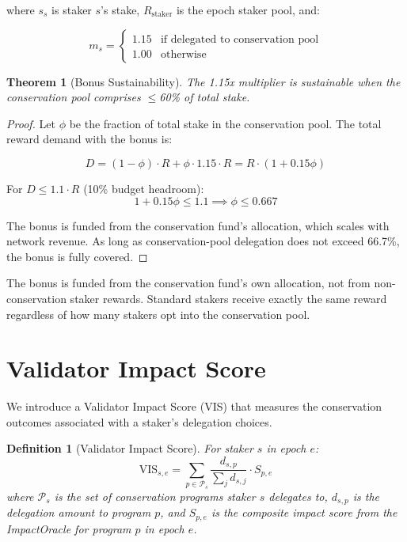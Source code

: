 \documentclass[11pt,letterpaper]{article}
\newtheorem{theorem}{Theorem}[section]
\newtheorem{definition}{Definition}[section]
\begin{document}
where $s_s$ is staker $s$'s stake, $R_{\text{staker}}$ is the epoch staker pool, and:

\begin{equation}
    m_s = \begin{cases} 1.15 & \text{if delegated to conservation pool} \\ 1.00 & \text{otherwise} \end{cases}
\end{equation}

\begin{theorem}[Bonus Sustainability]
The 1.15x multiplier is sustainable when the conservation pool comprises $\leq$60\% of total stake.
\end{theorem}

\begin{proof}
Let $\phi$ be the fraction of total stake in the conservation pool. The total reward demand with the bonus is:

\begin{equation}
    D = (1 - \phi) \cdot R + \phi \cdot 1.15 \cdot R = R \cdot (1 + 0.15\phi)
\end{equation}

For $D \leq 1.1 \cdot R$ (10\% budget headroom):
\begin{equation}
    1 + 0.15\phi \leq 1.1 \implies \phi \leq 0.667
\end{equation}

The bonus is funded from the conservation fund's allocation, which scales with network revenue. As long as conservation-pool delegation does not exceed 66.7\%, the bonus is fully covered.
\end{proof}

The bonus is funded from the conservation fund's own allocation, not from non-conservation staker rewards. Standard stakers receive exactly the same reward regardless of how many stakers opt into the conservation pool.

\section{Validator Impact Score}
\label{sec:vis}

We introduce a Validator Impact Score (VIS) that measures the conservation outcomes associated with a staker's delegation choices.

\begin{definition}[Validator Impact Score]
For staker $s$ in epoch $e$:
\begin{equation}
    \text{VIS}_{s,e} = \sum_{p \in \mathcal{P}_s} \frac{d_{s,p}}{\sum_j d_{s,j}} \cdot S_{p,e}
\end{equation}
where $\mathcal{P}_s$ is the set of conservation programs staker $s$ delegates to, $d_{s,p}$ is the delegation amount to program $p$, and $S_{p,e}$ is the composite impact score from the ImpactOracle for program $p$ in epoch $e$.
\end{definition}
\end{document}
